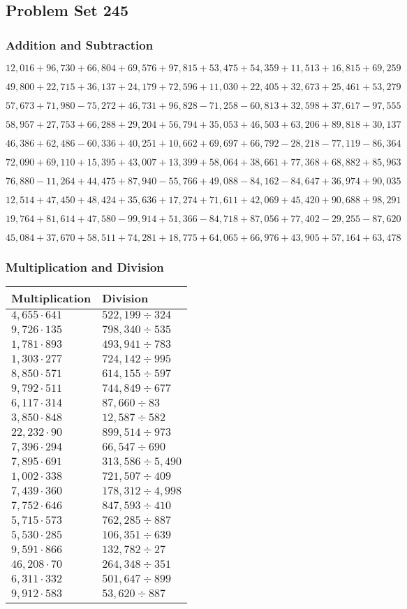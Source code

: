 \hypertarget{problem-set-245}{%
\subsection{Problem Set 245}\label{problem-set-245}}

\hypertarget{addition-and-subtraction}{%
\subsubsection{Addition and
Subtraction}\label{addition-and-subtraction}}

\(12,016+96,730+66,804+69,576+97,815+53,475+54,359+11,513+16,815+69,259\)

\(49,800+22,715+36,137+24,179+72,596+11,030+22,405+32,673+25,461+53,279\)

\(57,673+71,980-75,272+46,731+96,828-71,258-60,813+32,598+37,617-97,555\)

\(58,957+27,753+66,288+29,204+56,794+35,053+46,503+63,206+89,818+30,137\)

\(46,386+62,486-60,336+40,251+10,662+69,697+66,792-28,218-77,119-86,364\)

\(72,090+69,110+15,395+43,007+13,399+58,064+38,661+77,368+68,882+85,963\)

\(76,880-11,264+44,475+87,940-55,766+49,088-84,162-84,647+36,974+90,035\)

\(12,514+47,450+48,424+35,636+17,274+71,611+42,069+45,420+90,688+98,291\)

\(19,764+81,614+47,580-99,914+51,366-84,718+87,056+77,402-29,255-87,620\)

\(45,084+37,670+58,511+74,281+18,775+64,065+66,976+43,905+57,164+63,478\)

\hypertarget{multiplication-and-division}{%
\subsubsection{Multiplication and
Division}\label{multiplication-and-division}}

\begin{longtable}[]{@{}ll@{}}
\toprule
Multiplication & Division\tabularnewline
\midrule
\endhead
\(4,655\cdot641\) & \(522,199÷324\)\tabularnewline
\(9,726\cdot135\) & \(798,340÷535\)\tabularnewline
\(1,781\cdot893\) & \(493,941÷783\)\tabularnewline
\(1,303\cdot277\) & \(724,142÷995\)\tabularnewline
\(8,850\cdot571\) & \(614,155÷597\)\tabularnewline
\(9,792\cdot511\) & \(744,849÷677\)\tabularnewline
\(6,117\cdot314\) & \(87,660÷83\)\tabularnewline
\(3,850\cdot848\) & \(12,587÷582\)\tabularnewline
\(22,232\cdot90\) & \(899,514÷973\)\tabularnewline
\(7,396\cdot294\) & \(66,547÷690\)\tabularnewline
\(7,895\cdot691\) & \(313,586÷5,490\)\tabularnewline
\(1,002\cdot338\) & \(721,507÷409\)\tabularnewline
\(7,439\cdot360\) & \(178,312÷4,998\)\tabularnewline
\(7,752\cdot646\) & \(847,593÷410\)\tabularnewline
\(5,715\cdot573\) & \(762,285÷887\)\tabularnewline
\(5,530\cdot285\) & \(106,351÷639\)\tabularnewline
\(9,591\cdot866\) & \(132,782÷27\)\tabularnewline
\(46,208\cdot70\) & \(264,348÷351\)\tabularnewline
\(6,311\cdot332\) & \(501,647÷899\)\tabularnewline
\(9,912\cdot583\) & \(53,620÷887\)\tabularnewline
\bottomrule
\end{longtable}
